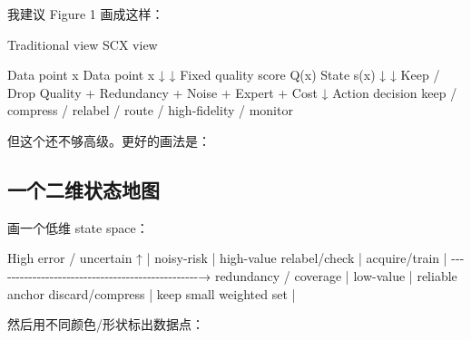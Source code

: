 \documentclass[
  12pt,
]{ctexart}
\newenvironment{Shaded}{}{}
\newcommand{\NormalTok}[1]{#1}
\begin{document}
我建议 Figure 1 画成这样：

\begin{Shaded}
\begin{Highlighting}[]
\NormalTok{Traditional view                      SCX view}

\NormalTok{Data point x                          Data point x}
\NormalTok{   ↓                                      ↓}
\NormalTok{Fixed quality score Q(x)              State s(x)}
\NormalTok{   ↓                                      ↓}
\NormalTok{Keep / Drop                            Quality + Redundancy + Noise + Expert + Cost}
\NormalTok{                                          ↓}
\NormalTok{                                      Action decision}
\NormalTok{                                      keep / compress / relabel / route / high{-}fidelity / monitor}
\end{Highlighting}
\end{Shaded}

但这个还不够高级。更好的画法是：

\subsection{\texorpdfstring{\textbf{一个二维状态地图}}{一个二维状态地图}}\label{ux4e00ux4e2aux4e8cux7ef4ux72b6ux6001ux5730ux56fe}

画一个低维 state space：

\begin{Shaded}
\begin{Highlighting}[]
\NormalTok{                 High error / uncertain}
\NormalTok{                         ↑}
\NormalTok{                         |}
\NormalTok{        noisy{-}risk       |      high{-}value}
\NormalTok{      relabel/check      |      acquire/train}
\NormalTok{                         |}
\NormalTok{ {-}{-}{-}{-}{-}{-}{-}{-}{-}{-}{-}{-}{-}{-}{-}{-}{-}{-}{-}{-}{-}{-}{-}{-}{-}{-}{-}{-}{-}{-}{-}{-}{-}{-}{-}{-}{-}{-}{-}{-}{-}{-}{-}{-}{-}{-}{-}{-}→ redundancy / coverage}
\NormalTok{                         |}
\NormalTok{        low{-}value        |      reliable anchor}
\NormalTok{        discard/compress |      keep small weighted set}
\NormalTok{                         |}
\end{Highlighting}
\end{Shaded}

然后用不同颜色/形状标出数据点：
\end{document}
